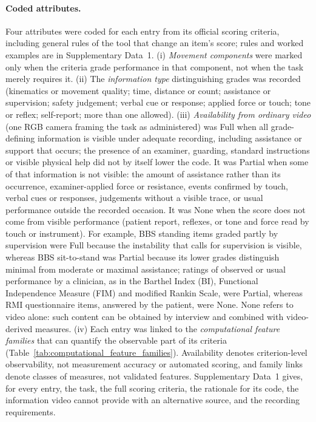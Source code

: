 \documentclass[11pt]{article}
\begin{document}
\paragraph{Coded attributes.} Four attributes were coded for each entry from its official scoring criteria, including general rules of the tool that change an item's score; rules and worked examples are in Supplementary Data~1. (i) \emph{Movement components} were marked only when the criteria grade performance in that component, not when the task merely requires it. (ii) The \emph{information type} distinguishing grades was recorded (kinematics or movement quality; time, distance or count; assistance or supervision; safety judgement; verbal cue or response; applied force or touch; tone or reflex; self-report; more than one allowed). (iii) \emph{Availability from ordinary video} (one RGB camera framing the task as administered) was Full when all grade-defining information is visible under adequate recording, including assistance or support that occurs; the presence of an examiner, guarding, standard instructions or visible physical help did not by itself lower the code. It was Partial when some of that information is not visible: the amount of assistance rather than its occurrence, examiner-applied force or resistance, events confirmed by touch, verbal cues or responses, judgements without a visible trace, or usual performance outside the recorded occasion. It was None when the score does not come from visible performance (patient report, reflexes, or tone and force read by touch or instrument). For example, BBS standing items graded partly by supervision were Full because the instability that calls for supervision is visible, whereas BBS sit-to-stand was Partial because its lower grades distinguish minimal from moderate or maximal assistance; ratings of observed or usual performance by a clinician, as in the Barthel Index (BI), Functional Independence Measure (FIM) and modified Rankin Scale, were Partial, whereas RMI questionnaire items, answered by the patient, were None. None refers to video alone: such content can be obtained by interview and combined with video-derived measures. (iv) Each entry was linked to the \emph{computational feature families} that can quantify the observable part of its criteria (Table~\ref{tab:computational_feature_families}). Availability denotes criterion-level observability, not measurement accuracy or automated scoring, and family links denote classes of measures, not validated features. Supplementary Data~1 gives, for every entry, the task, the full scoring criteria, the rationale for its code, the information video cannot provide with an alternative source, and the recording requirements.
\end{document}
